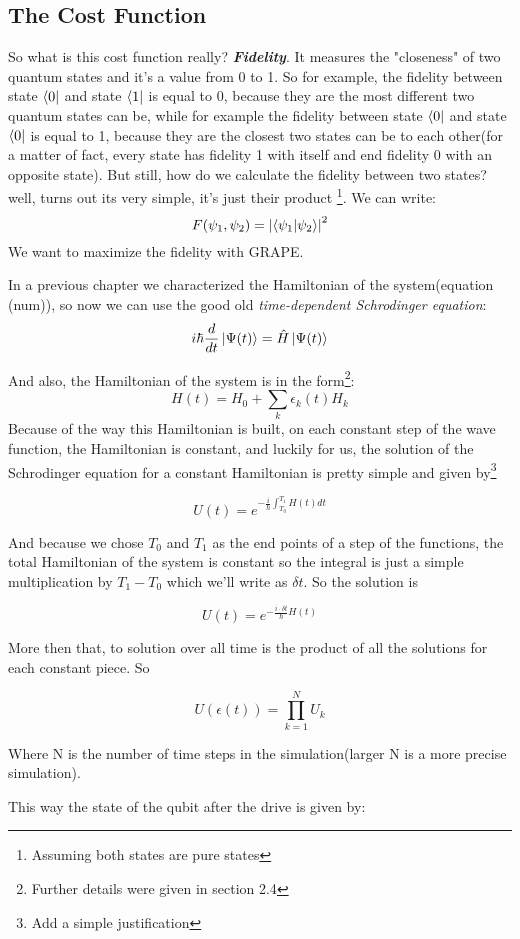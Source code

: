 \documentclass{article}
\begin{document}
\subsection{The Cost Function}
So what is this cost function really? \textit{\textbf{Fidelity}}. It measures the "closeness" of two quantum states and it's a value from 0 to 1. So for example, the fidelity between state $\bra{0}$ and state $\bra{1}$ is equal to 0, because they are the most different two quantum states can be, while for example the fidelity between state $\bra{0}$ and state $\bra{0}$ is equal to 1, because they are the closest two states can be to each other(for a matter of fact, every state has fidelity 1 with itself and end fidelity 0 with an opposite state). But still, how do we calculate the fidelity between two states? well, turns out its very simple, it's just their product \footnote{Assuming both states are pure states}. We can write:
$$F(\psi_1, \psi_2) = \abs{\braket{\psi_1}{\psi_2}}^2$$
We want to maximize the fidelity with GRAPE.\par
In a previous chapter we characterized the Hamiltonian of the system(equation (num)), so now we can use the good old \textit{time-dependent Schrodinger equation}:
$$i\hbar\frac{d}{dt}\ket{\Psi(t)} = \hat{H}\ket{\Psi(t)}$$

And also, the Hamiltonian of the system is in the form\footnote{Further details were given in section 2.4}:
$$H(t) = H_0 + \sum_k{\epsilon_k(t) H_k}$$ %
Because of the way this Hamiltonian is built, on each constant step of the wave function, the Hamiltonian is constant, and luckily for us, the solution of the Schrodinger equation for a constant Hamiltonian is pretty simple and given by\footnote{Add a simple justification}

$$U(t) = e^{-\frac{i}{\hbar}\int_{T_0}^{T_1}H(t)dt}$$

And because we chose $T_0$ and $T_1$ as the end points of a step of the functions, the total Hamiltonian of the system is constant so the integral is just a simple multiplication by $T_1-T_0$ which we'll write as $\delta t$. So the solution is

$$U(t) = e^{-\frac{i\cdot \delta t}{\hbar}H(t)}$$

More then that, to solution over all time is the product of all the solutions for each constant piece. So 

$$U(\epsilon(t)) = \prod_{k = 1}^NU_k$$

Where N is the number of time steps in the simulation(larger N is a more precise simulation). \par
This way the state of the qubit after the drive is given by:
\end{document}
